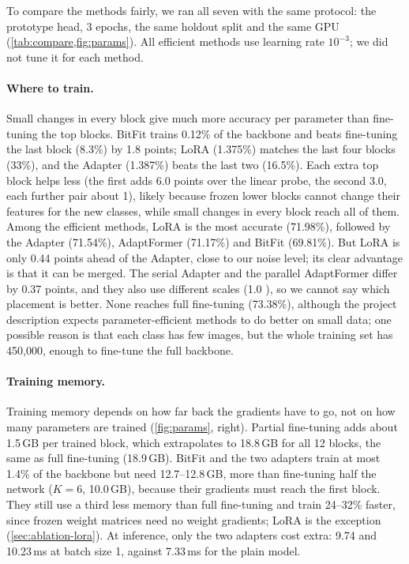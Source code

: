 To compare the methods fairly, we ran all seven with the same protocol: the prototype head, 3 epochs, the same holdout split and the same GPU (\cref{tab:compare,fig:params}).
All efficient methods use learning rate $10^{-3}$; we did not tune it for each method.

\paragraph{Where to train.}
Small changes in every block give much more accuracy per parameter than fine-tuning the top blocks.
BitFit trains 0.12\% of the backbone and beats fine-tuning the last block (8.3\%) by 1.8 points; LoRA (1.375\%) matches the last four blocks (33\%), and the Adapter (1.387\%) beats the last two (16.5\%).
Each extra top block helps less (the first adds 6.0 points over the linear probe, the second 3.0, each further pair about 1), likely because frozen lower blocks cannot change their features for the new classes, while small changes in every block reach all of them.
Among the efficient methods, LoRA is the most accurate (71.98\%), followed by the Adapter (71.54\%), AdaptFormer (71.17\%) and BitFit (69.81\%).
But LoRA is only 0.44 points ahead of the Adapter, close to our noise level; its clear advantage is that it can be merged.
The serial Adapter and the parallel AdaptFormer differ by 0.37 points, and they also use different scales (1.0 ), so we cannot say which placement is better.
None reaches full fine-tuning (73.38\%), although the project description expects parameter-efficient methods to do better on small data; one possible reason is that each class has few images, but the whole training set has 450,000, enough to fine-tune the full backbone.

\paragraph{Training memory.}
Training memory depends on how far back the gradients have to go, not on how many parameters are trained (\cref{fig:params}, right).
Partial fine-tuning adds about 1.5\,GB per trained block, which extrapolates to 18.8\,GB for all 12 blocks, the same as full fine-tuning (18.9\,GB).
BitFit and the two adapters train at most 1.4\% of the backbone but need 12.7--12.8\,GB, more than fine-tuning half the network ($K = 6$, 10.0\,GB), because their gradients must reach the first block.
They still use a third less memory than full fine-tuning and train 24--32\% faster, since frozen weight matrices need no weight gradients; LoRA is the exception (\cref{sec:ablation-lora}).
At inference, only the two adapters cost extra: 9.74 and 10.23\,ms at batch size 1, against 7.33\,ms for the plain model.

